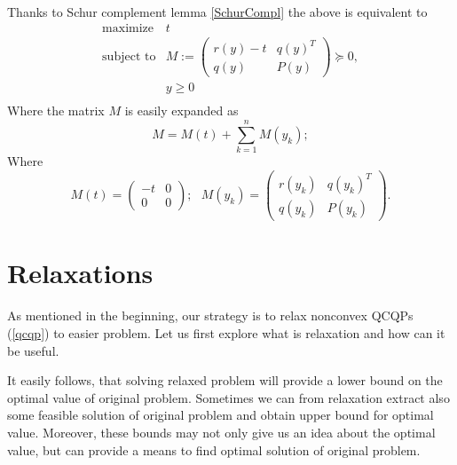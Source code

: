 \documentclass[10pt,oneside]{book}
\theoremstyle{definition}
\begin{document}
Thanks to Schur complement lemma \ref{SchurCompl} the above is equivalent to
\begin{equation}
\begin{array}{ll}
\mbox{maximize} & t \\
\mbox{subject to}& M:=\left(\begin{array}{ll}
r(y)-t & q(y)^T \\
q(y) & P(y)
\end{array}\right)\succeq 0,
 \\
&y \geq 0\\
\end{array} 
\end{equation}
Where the matrix $M$ is easily expanded as 
\begin{equation}
M=M(t) + \sum_{k=1}^n M(y_k); 
\end{equation}
Where
\begin{equation}
M(t) = \left(\begin{array}{rr} -t& 0\\ 0 & 0 \end{array}\right) ; \ \ \ 
M(y_k) = \left(\begin{array}{rr} r(y_k)& q(y_k)^T\\ q(y_k) & P(y_k) \end{array}\right) . 
\end{equation}













\section{Relaxations}

As mentioned in the beginning, our strategy is to relax nonconvex QCQPs (\ref{qcqp}) to easier problem. Let us first explore what is relaxation and how can it be useful.


It easily follows, that solving relaxed problem will provide a lower bound on the optimal value of original problem. Sometimes we can from relaxation extract also some feasible solution of original problem and obtain upper bound for optimal value. Moreover, these bounds may not only give us an idea about the optimal value, but can provide a means to find optimal solution of original problem. 
\end{document}
